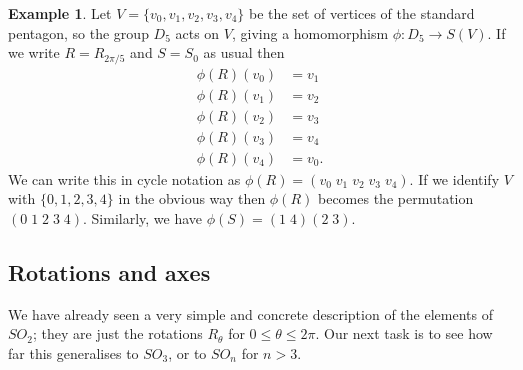\documentclass{amsart}
\newcommand{\xra}       {\xrightarrow}
\newcommand{\blob}      {circle(0.03cm)}
\renewcommand{\:}{\colon}
\theoremstyle{definition}
\newtheorem{example}[theorem]{Example}
\begin{document}
\begin{example}
 Let $V=\{v_0,v_1,v_2,v_3,v_4\}$ be the set of vertices of the
 standard pentagon, so the group $D_5$ acts on $V$, giving a
 homomorphism $\phi\:D_5\xra{}S(V)$.  If we write $R=R_{2\pi/5}$ and
 $S=S_0$ as usual then
 \begin{align*}
  \phi(R)(v_0) &= v_1 \\
  \phi(R)(v_1) &= v_2 \\
  \phi(R)(v_2) &= v_3 \\
  \phi(R)(v_3) &= v_4 \\
  \phi(R)(v_4) &= v_0.
 \end{align*}
 We can write this in cycle notation as
 $\phi(R)=(v_0\;v_1\;v_2\;v_3\;v_4)$.  If we identify $V$ with
 $\{0,1,2,3,4\}$ in the obvious way then $\phi(R)$ becomes the
 permutation $(0\;1\;2\;3\;4)$.  Similarly, we have
 $\phi(S)=(1\;4)(2\;3)$.
 \begin{center}
 \end{center}
\end{example}

\subsection{Rotations and axes}
\label{subsec-axes}

We have already seen a very simple and concrete description of the
elements of $SO_2$; they are just the rotations $R_\theta$ for
$0\leq\theta\leq 2\pi$.  Our next task is to see how far this
generalises to $SO_3$, or to $SO_n$ for $n>3$.
\end{document}
